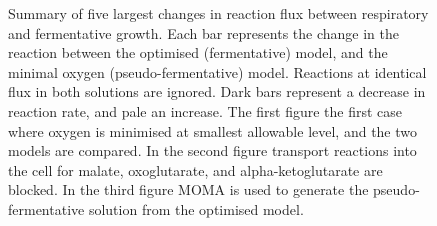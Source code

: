 \begin{figure}
  \centering
  \hfill
  \caption[Reaction changes between respiratory and fermentative growth]{Summary of five largest changes in reaction flux between respiratory and fermentative growth. Each bar represents the change in the reaction between the optimised (fermentative) model, and the minimal oxygen (pseudo-fermentative) model. Reactions at identical flux in both solutions are ignored. Dark bars represent a decrease in reaction rate, and pale an increase. The first figure the first case where oxygen is minimised at smallest allowable level, and the two models are compared. In the second figure transport reactions into the cell for malate, oxoglutarate, and alpha-ketoglutarate are blocked. In the third figure MOMA \cite{segre2002} is used to generate the pseudo-fermentative solution from the optimised model.}
  \label{figure:most_changing_reactions}
\end{figure}

